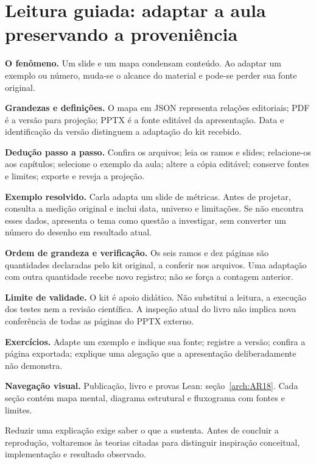 \section[Leitura guiada]{Leitura guiada: adaptar a aula preservando a proveniência}
\begin{descricao}
\textbf{O fenômeno.} Um slide e um mapa condensam conteúdo. Ao adaptar um exemplo ou número, muda-se o alcance do material e pode-se perder sua fonte original.
\end{descricao}
\begin{definicao}
\textbf{Grandezas e definições.} O mapa em JSON representa relações editoriais; PDF é a versão para projeção; PPTX é a fonte editável da apresentação. Data e identificação da versão distinguem a adaptação do kit recebido.
\end{definicao}
\begin{metodo}
\textbf{Dedução passo a passo.} Confira os arquivos; leia os ramos e slides; relacione-os aos capítulos; selecione o exemplo da aula; altere a cópia editável; conserve fontes e limites; exporte e reveja a projeção.
\end{metodo}
\begin{resultado}
\textbf{Exemplo resolvido.} Carla adapta um slide de métricas. Antes de projetar, consulta a medição original e inclui data, universo e limitações. Se não encontra esses dados, apresenta o tema como questão a investigar, sem converter um número do desenho em resultado atual.
\end{resultado}
\begin{resultado}
\textbf{Ordem de grandeza e verificação.} Os seis ramos e dez páginas são quantidades declaradas pelo kit original, a conferir nos arquivos. Uma adaptação com outra quantidade recebe novo registro; não se força a contagem anterior.
\end{resultado}
\begin{aviso}
\textbf{Limite de validade.} O kit é apoio didático. Não substitui a leitura, a execução dos testes nem a revisão científica. A inspeção atual do livro não implica nova conferência de todas as páginas do PPTX externo.
\end{aviso}
\begin{resultado}
\textbf{Exercícios.} Adapte um exemplo e indique sua fonte; registre a versão; confira a página exportada; explique uma alegação que a apresentação deliberadamente não demonstra.
\end{resultado}



\begin{descricao}\textbf{Navegação visual.} Publicação, livro e provas Lean: seção~\ref{arch:AR18}. Cada seção contém mapa mental, diagrama estrutural e fluxograma com fontes e limites.\end{descricao}


Reduzir uma explicação exige saber o que a sustenta. Antes de concluir a reprodução, voltaremos às teorias citadas para distinguir inspiração conceitual, implementação e resultado observado.

